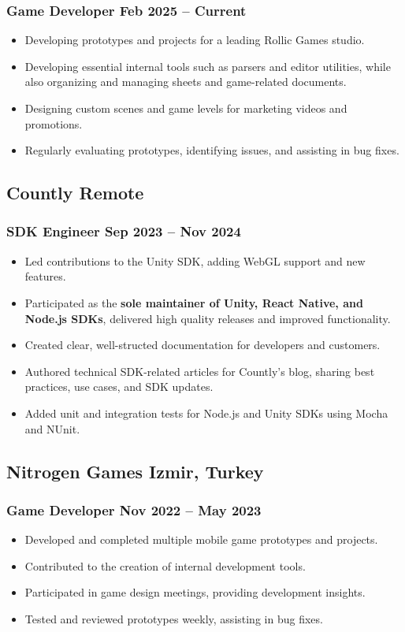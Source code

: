 \documentclass[11pt]{article}
\newcommand{\rside}[1]{
  \hfill {\normalfont\color{accent} #1}%
}
\begin{document}
\subsubsection{Game Developer \rside{Feb 2025 -- Current}}
\begin{itemize}
  \item Developing prototypes and projects for a leading Rollic Games studio.
  \item Developing essential internal tools such as parsers and editor utilities, while also organizing and managing sheets and game-related documents.
  \item Designing custom scenes and game levels for marketing videos and promotions.
  \item Regularly evaluating prototypes, identifying issues, and assisting in bug fixes.
\end{itemize}

\subsection{Countly \rside{Remote}}
\subsubsection{SDK Engineer \rside{Sep 2023 -- Nov 2024}}
\begin{itemize}
  \item Led contributions to the Unity SDK, adding WebGL support and new features.
  \item Participated as the \textbf{sole maintainer of Unity, React Native, and Node.js SDKs}, delivered high quality releases and improved functionality. 
  \item Created clear, well-structed documentation for developers and customers.
  \item Authored technical SDK-related articles for Countly's blog, sharing best practices, use cases, and SDK updates.
  \item Added unit and integration tests for Node.js and Unity SDKs using Mocha and NUnit.
\end{itemize}

\subsection{Nitrogen Games \rside{Izmir, Turkey}}
\subsubsection{Game Developer \rside{Nov 2022 -- May 2023}}
\begin{itemize}
  \item Developed and completed multiple mobile game prototypes and projects.
  \item Contributed to the creation of internal development tools.
  \item Participated in game design meetings, providing development insights.
  \item Tested and reviewed prototypes weekly, assisting in bug fixes.
\end{itemize}
\end{document}
